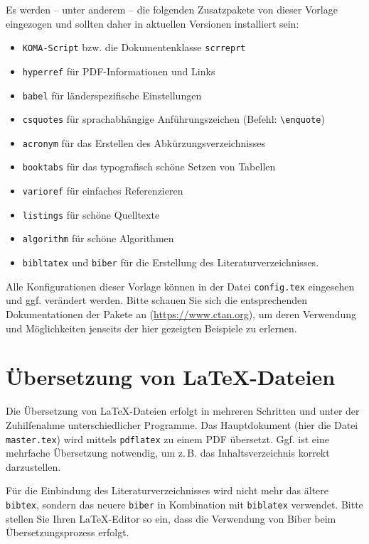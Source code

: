 Es werden -- unter anderem -- die folgenden Zusatzpakete von dieser Vorlage eingezogen und sollten daher in aktuellen Versionen installiert sein: 
\begin{itemize}
	\item\texttt{KOMA-Script} bzw. die Dokumentenklasse \texttt{scrreprt}
	\item\texttt{hyperref} für PDF-Informationen und Links 
	\item \texttt{babel} für länderspezifische Einstellungen
	\item \texttt{csquotes} für sprachabhängige Anführungszeichen (Befehl: \texttt{\textbackslash enquote})
	\item \texttt{acronym} für das Erstellen des Abkürzungsverzeichnisses 
	\item \texttt{booktabs} für das typografisch schöne Setzen von Tabellen 
	\item \texttt{varioref} für einfaches Referenzieren 
	\item \texttt{listings} für schöne Quelltexte
	\item \texttt{algorithm} für schöne Algorithmen
	\item \texttt{bibltatex} und \texttt{biber} für die Erstellung des Literaturverzeichnisses.
\end{itemize}
Alle Konfigurationen dieser Vorlage können in der Datei \texttt{config.tex} eingesehen und ggf. verändert werden. Bitte schauen Sie sich die entsprechenden Dokumentationen 
der Pakete an (\url{https://www.ctan.org}), um deren Verwendung und Möglichkeiten jenseits der hier gezeigten Beispiele zu erlernen.


\section{Übersetzung von \LaTeX-Dateien}
Die Übersetzung von \LaTeX-Dateien erfolgt in mehreren Schritten und unter der Zuhilfenahme unterschiedlicher Programme. Das 
Hauptdokument (hier die Datei \texttt{master.tex}) wird mittels \texttt{pdflatex} zu einem PDF übersetzt. 
Ggf. ist eine mehrfache Übersetzung notwendig, um z.\,B. das Inhaltsverzeichnis korrekt darzustellen. 

Für die Einbindung des Literaturverzeichnisses wird nicht mehr das ältere \texttt{bibtex}, sondern das neuere \texttt{biber} in Kombination mit \texttt{biblatex} verwendet. Bitte stellen Sie Ihren \LaTeX-Editor so ein, dass die Verwendung von Biber beim Übersetzungsprozess erfolgt. 


